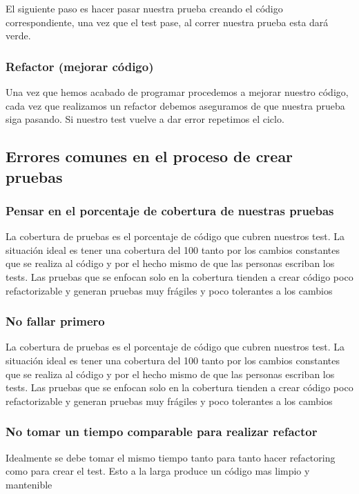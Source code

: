 El siguiente paso es hacer pasar nuestra prueba creando el código
correspondiente, una vez que el test pase, al correr nuestra prueba esta dará
verde.

\subsubsection{Refactor (mejorar código)}

Una vez que hemos acabado de programar procedemos a mejorar nuestro código,
cada vez que realizamos un refactor debemos aseguramos de que nuestra prueba
siga pasando. Si nuestro test vuelve a dar error repetimos el ciclo.

\subsection{Errores comunes en el proceso de crear pruebas}

\subsubsection{Pensar en el porcentaje de cobertura de nuestras pruebas}
La cobertura de pruebas es el porcentaje de código que cubren nuestros test. La
situación ideal es tener una cobertura del 100%
tanto por los cambios constantes que se realiza al código y por el hecho mismo
de que las personas escriban los tests. Las pruebas que se enfocan solo en la
cobertura tienden a crear código poco refactorizable y generan pruebas muy
frágiles y poco tolerantes a los cambios

\subsubsection{No fallar primero}
La cobertura de pruebas es el porcentaje de código que cubren nuestros test. La
situación ideal es tener una cobertura del 100%
tanto por los cambios constantes que se realiza al código y por el hecho mismo
de que las personas escriban los tests. Las pruebas que se enfocan solo en la
cobertura tienden a crear código poco refactorizable y generan pruebas muy
frágiles y poco tolerantes a los cambios

\subsubsection{No tomar un tiempo comparable para realizar refactor}

Idealmente se debe tomar el mismo tiempo tanto para tanto hacer refactoring
como para crear el test. Esto a la larga produce un código mas limpio y
mantenible

